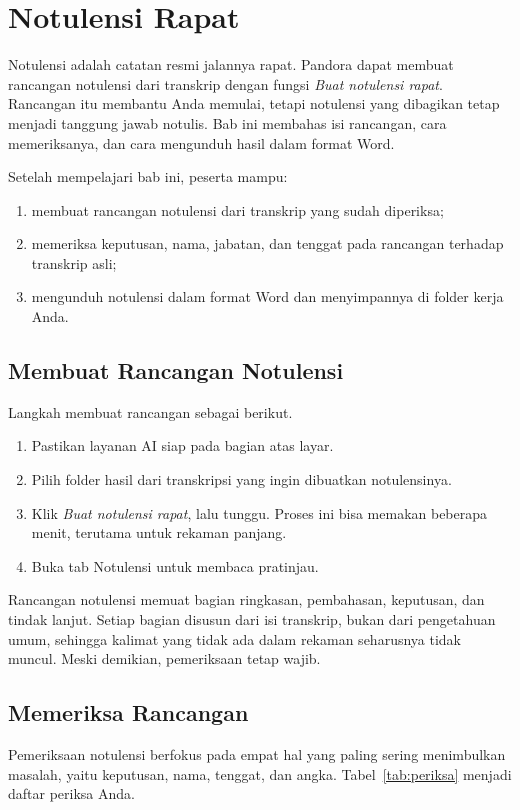\chapter{Notulensi Rapat}

Notulensi adalah catatan resmi jalannya rapat. Pandora dapat membuat rancangan notulensi dari transkrip dengan fungsi \emph{Buat notulensi rapat}. Rancangan itu membantu Anda memulai, tetapi notulensi yang dibagikan tetap menjadi tanggung jawab notulis. Bab ini membahas isi rancangan, cara memeriksanya, dan cara mengunduh hasil dalam format Word.

\begin{indikator}
Setelah mempelajari bab ini, peserta mampu:
\begin{enumerate}
  \item membuat rancangan notulensi dari transkrip yang sudah diperiksa;
  \item memeriksa keputusan, nama, jabatan, dan tenggat pada rancangan terhadap transkrip asli;
  \item mengunduh notulensi dalam format Word dan menyimpannya di folder kerja Anda.
\end{enumerate}
\end{indikator}

\section{Membuat Rancangan Notulensi}
Langkah membuat rancangan sebagai berikut.
\begin{enumerate}
  \item Pastikan layanan AI siap pada bagian atas layar.
  \item Pilih folder hasil dari transkripsi yang ingin dibuatkan notulensinya.
  \item Klik \emph{Buat notulensi rapat}, lalu tunggu. Proses ini bisa memakan beberapa menit, terutama untuk rekaman panjang.
  \item Buka tab Notulensi untuk membaca pratinjau.
\end{enumerate}

Rancangan notulensi memuat bagian ringkasan, pembahasan, keputusan, dan tindak lanjut. Setiap bagian disusun dari isi transkrip, bukan dari pengetahuan umum, sehingga kalimat yang tidak ada dalam rekaman seharusnya tidak muncul. Meski demikian, pemeriksaan tetap wajib.

\section{Memeriksa Rancangan}
Pemeriksaan notulensi berfokus pada empat hal yang paling sering menimbulkan masalah, yaitu keputusan, nama, tenggat, dan angka. Tabel~\ref{tab:periksa} menjadi daftar periksa Anda.

